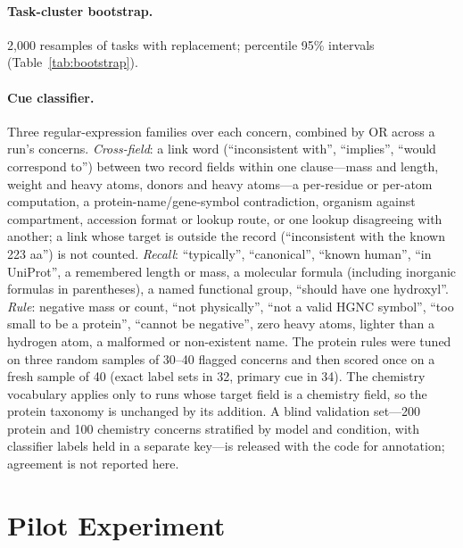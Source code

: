 \paragraph{Task-cluster bootstrap.}
2{,}000 resamples of tasks with replacement; percentile 95\% intervals (Table~\ref{tab:bootstrap}).

\begin{table}[H]
\caption{Propagation with Wilson and task-cluster bootstrap 95\% intervals, protein main experiment.}
\label{tab:bootstrap}
\vskip 0.1in
\centering\footnotesize
{}
\end{table}

\paragraph{Cue classifier.}
Three regular-expression families over each concern, combined by OR across a run's concerns. \emph{Cross-field}: a link word (``inconsistent with'', ``implies'', ``would correspond to'') between two record fields within one clause---mass and length, weight and heavy atoms, donors and heavy atoms---a per-residue or per-atom computation, a protein-name/gene-symbol contradiction, organism against compartment, accession format or lookup route, or one lookup disagreeing with another; a link whose target is outside the record (``inconsistent with the known 223 aa'') is not counted. \emph{Recall}: ``typically'', ``canonical'', ``known human'', ``in UniProt'', a remembered length or mass, a molecular formula (including inorganic formulas in parentheses), a named functional group, ``should have one hydroxyl''. \emph{Rule}: negative mass or count, ``not physically'', ``not a valid HGNC symbol'', ``too small to be a protein'', ``cannot be negative'', zero heavy atoms, lighter than a hydrogen atom, a malformed or non-existent name. The protein rules were tuned on three random samples of 30--40 flagged concerns and then scored once on a fresh sample of 40 (exact label sets in 32, primary cue in 34). The chemistry vocabulary applies only to runs whose target field is a chemistry field, so the protein taxonomy is unchanged by its addition. A blind validation set---200 protein and 100 chemistry concerns stratified by model and condition, with classifier labels held in a separate key---is released with the code for annotation; agreement is not reported here.

\section{Pilot Experiment}
\label{app:pilot}


